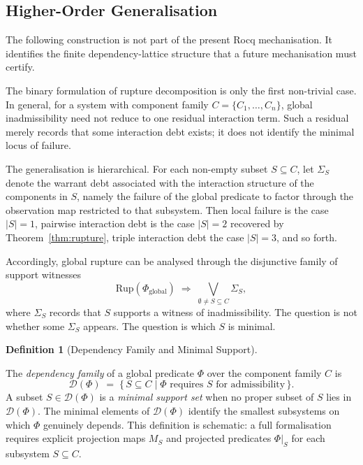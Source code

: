 \documentclass[pdflatex,sn-mathphys-num]{sn-jnl}
\theoremstyle{plain}
\theoremstyle{definition}
\newtheorem{definition}[theorem]{Definition}
\theoremstyle{remark}
\begin{document}
\subsection{Higher-Order Generalisation}
\label{subsec:higher-order}

The following construction is not part of the present Rocq
mechanisation.
It identifies the finite dependency-lattice structure that a future
mechanisation must certify.

The binary formulation of rupture decomposition is only the first
non-trivial case.
In general, for a system with component family
$
C = \{C_1,\dots,C_n\}
$,
global inadmissibility need not reduce to one residual interaction term.
Such a residual merely records that some interaction debt exists; it
does not identify the minimal locus of failure.

The generalisation is hierarchical.
For each non-empty subset
$
S \subseteq C
$,
let
$
\Sigma_S
$
denote the warrant debt associated with the interaction structure of
the components in $S$, namely the failure of the global predicate to
factor through the observation map restricted to that subsystem.
Then local failure is the case $|S| = 1$, pairwise interaction debt
is the case $|S| = 2$ recovered by Theorem~\ref{thm:rupture}, triple
interaction debt the case $|S| = 3$, and so forth.

Accordingly, global rupture can be analysed through the disjunctive
family of support witnesses
\[
\mathrm{Rup}(\Phi_{\mathrm{global}})
\;\Rightarrow\;
\bigvee_{\emptyset \neq S \subseteq C}
\Sigma_S,
\]
where $\Sigma_S$ records that $S$ supports a witness of inadmissibility.
The question is not whether some $\Sigma_S$ appears.
The question is which $S$ is minimal.

\begin{definition}[Dependency Family and Minimal Support]
\label{def:dependency-family}

The \emph{dependency family} of a global predicate $\Phi$ over the
component family $C$ is
\[
\mathcal{D}(\Phi)
\;=\;
\{\,S \subseteq C
\mid
\Phi \text{ requires } S \text{ for admissibility}\,\}.
\]
A subset $S \in \mathcal{D}(\Phi)$ is a \emph{minimal support set}
when no proper subset of $S$ lies in $\mathcal{D}(\Phi)$.
The minimal elements of $\mathcal{D}(\Phi)$ identify the smallest
subsystems on which $\Phi$ genuinely depends.
This definition is schematic: a full formalisation requires explicit
projection maps $M_S$ and projected predicates $\Phi|_S$ for each
subsystem $S \subseteq C$.

\end{definition}
\end{document}
